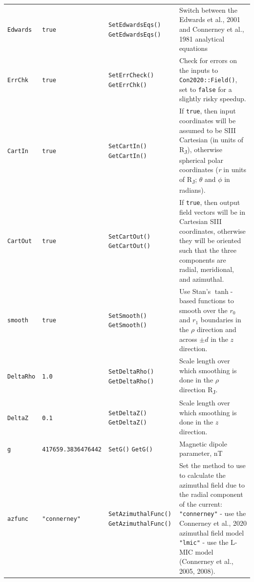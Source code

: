 \begin{tabular}{|l|l|l|p{5cm}|}
	  \texttt{Edwards} & \texttt{true} & \texttt{SetEdwardsEqs()} \newline \texttt{GetEdwardsEqs()} & Switch between the Edwards et al., 2001 and Connerney et al., 1981 analytical equations \\
	  \texttt{ErrChk} & \texttt{true} & \texttt{SetErrCheck()} \newline \texttt{GetErrChk()} & Check for errors on the inputs to \texttt{Con2020::Field()}, set to \texttt{false} for a slightly risky speedup. \\
	  \texttt{CartIn} & \texttt{true} & \texttt{SetCartIn()} \newline \texttt{GetCartIn()} & If \texttt{true}, then input coordinates will be assumed to be SIII Cartesian (in units of R\textsubscript{J}), otherwise spherical polar coordinates (\textit{r} in units of R\textsubscript{J}; $\theta$ and $\phi$ in radians). \\
	  \texttt{CartOut} & \texttt{true} & \texttt{SetCartOut()} \newline \texttt{GetCartOut()} & If \texttt{true}, then output field vectors will be in Cartesian SIII coordinates, otherwise they will be oriented such that the three components are radial, meridional, and azimuthal. \\
	  \texttt{smooth} & \texttt{true} & \texttt{SetSmooth()} \newline \texttt{GetSmooth()} & Use Stan's $\tanh$-based functions to smooth over the $r_0$ and $r_1$ boundaries in the $\rho$ direction and across $\pm d$ in the $z$ direction. \\
	  \texttt{DeltaRho} & \texttt{1.0} & \texttt{SetDeltaRho()} \newline \texttt{GetDeltaRho()} & Scale length over which smoothing is done in the $\rho$ direction R\textsubscript{J}. \\
	  \texttt{DeltaZ} & \texttt{0.1} & \texttt{SetDeltaZ()} \newline \texttt{GetDeltaZ()} & Scale length over which smoothing is done in the $z$ direction. \\
	  \texttt{g} & \texttt{417659.3836476442} & \texttt{SetG()} \newline \texttt{GetG()} & Magnetic dipole parameter, nT \\
	  \texttt{azfunc} & \texttt{"connerney"} & \texttt{SetAzimuthalFunc()} \newline \texttt{GetAzimuthalFunc()} & Set the method to use to calculate the azimuthal field due to the radial component of the current: \newline \texttt{"connerney"} - use the Connerney et al., 2020 azimuthal field model \newline \texttt{"lmic"} - use the L-MIC model (Connerney et al., 2005, 2008). \\

\end{tabular}
